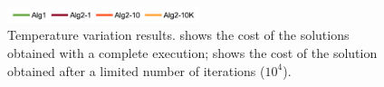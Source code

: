 \begin{figure}[!htp]
	\centering
	\includegraphics[width=0.5\textwidth]{report/images/temp-leg.png}

	\hfill
	\caption[Temperature Variations]{Temperature variation results.  shows the cost of the solutions obtained with a complete execution;
	 shows the cost of the solution obtained after a limited number of iterations ($10^{4}$).
	}
	\label{fig:temp}
\end{figure}
